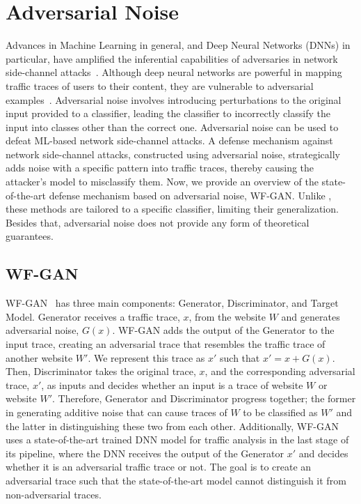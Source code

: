 \section{Adversarial Noise}\label{subsec:adversarial-noise}
Advances in Machine Learning in general, and Deep Neural Networks (DNNs) in particular, have amplified the inferential capabilities of adversaries in network side-channel attacks~\cite{sirinam2018df}.
Although deep neural networks are powerful in mapping traffic traces of users to their content, they are vulnerable to adversarial examples~\cite{goodfellow2014explaining}.
Adversarial noise involves introducing perturbations to the original input provided to a classifier, leading the classifier to incorrectly classify the input into classes other than the correct one.
Adversarial noise can be used to defeat ML-based network side-channel attacks.
A defense mechanism against network side-channel attacks, constructed using adversarial noise, strategically adds noise with a specific pattern into traffic traces, thereby causing the attacker's model to misclassify them.
Now, we provide an overview of the state-of-the-art defense mechanism based on adversarial noise, WF-GAN. 
Unlike {\sys}, these methods are tailored to a specific classifier, limiting their generalization.
Besides that, adversarial noise does not provide any form of theoretical guarantees.

\subsection{WF-GAN}\label{subsubsec:wf-gan}
WF-GAN~\cite{hou2020wf} has three main components: Generator, Discriminator, and Target Model.
Generator receives a traffic trace, $x$, from the website $W$ and generates adversarial noise, $G(x)$. 
WF-GAN adds the output of the Generator to the input trace, creating an adversarial trace that resembles the traffic trace of another website $W'$.
We represent this trace as $x'$ such that $x'=x + G(x)$.
Then, Discriminator takes the original trace, $x$, and the corresponding adversarial trace, $x'$, as inputs and decides whether an input is a trace of website $W$ or website $W'$.
Therefore, Generator and Discriminator progress together; the former in generating additive noise that can cause traces of $W$ to be classified as $W'$ and the latter in distinguishing these two from each other.
Additionally, WF-GAN uses a state-of-the-art trained DNN model for traffic analysis in the last stage of its pipeline, where the DNN receives the output of the Generator $x'$ and decides whether it is an adversarial traffic trace or not. 
The goal is to create an adversarial trace such that the state-of-the-art model cannot distinguish it from non-adversarial traces.

